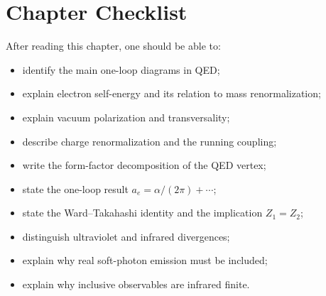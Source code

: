 \section{Chapter Checklist}

After reading this chapter, one should be able to:
\begin{itemize}
    \item identify the main one-loop diagrams in QED;
    \item explain electron self-energy and its relation to mass renormalization;
    \item explain vacuum polarization and transversality;
    \item describe charge renormalization and the running coupling;
    \item write the form-factor decomposition of the QED vertex;
    \item state the one-loop result \(a_e=\alpha/(2\pi)+\cdots\);
    \item state the Ward--Takahashi identity and the implication \(Z_1=Z_2\);
    \item distinguish ultraviolet and infrared divergences;
    \item explain why real soft-photon emission must be included;
    \item explain why inclusive observables are infrared finite.
\end{itemize}
